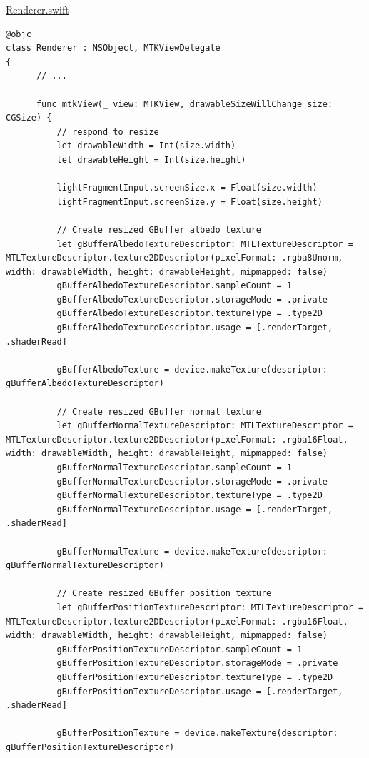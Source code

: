 \documentclass[11pt]{article}
\begin{document}
\uline{Renderer.swift}
\begin{verbatim}
@objc
class Renderer : NSObject, MTKViewDelegate
{
      // ...

      func mtkView(_ view: MTKView, drawableSizeWillChange size: CGSize) {
          // respond to resize
          let drawableWidth = Int(size.width)
          let drawableHeight = Int(size.height)

          lightFragmentInput.screenSize.x = Float(size.width)
          lightFragmentInput.screenSize.y = Float(size.height)

          // Create resized GBuffer albedo texture
          let gBufferAlbedoTextureDescriptor: MTLTextureDescriptor = MTLTextureDescriptor.texture2DDescriptor(pixelFormat: .rgba8Unorm, width: drawableWidth, height: drawableHeight, mipmapped: false)
          gBufferAlbedoTextureDescriptor.sampleCount = 1
          gBufferAlbedoTextureDescriptor.storageMode = .private
          gBufferAlbedoTextureDescriptor.textureType = .type2D
          gBufferAlbedoTextureDescriptor.usage = [.renderTarget, .shaderRead]

          gBufferAlbedoTexture = device.makeTexture(descriptor: gBufferAlbedoTextureDescriptor)

          // Create resized GBuffer normal texture
          let gBufferNormalTextureDescriptor: MTLTextureDescriptor = MTLTextureDescriptor.texture2DDescriptor(pixelFormat: .rgba16Float, width: drawableWidth, height: drawableHeight, mipmapped: false)
          gBufferNormalTextureDescriptor.sampleCount = 1
          gBufferNormalTextureDescriptor.storageMode = .private
          gBufferNormalTextureDescriptor.textureType = .type2D
          gBufferNormalTextureDescriptor.usage = [.renderTarget, .shaderRead]

          gBufferNormalTexture = device.makeTexture(descriptor: gBufferNormalTextureDescriptor)

          // Create resized GBuffer position texture
          let gBufferPositionTextureDescriptor: MTLTextureDescriptor = MTLTextureDescriptor.texture2DDescriptor(pixelFormat: .rgba16Float, width: drawableWidth, height: drawableHeight, mipmapped: false)
          gBufferPositionTextureDescriptor.sampleCount = 1
          gBufferPositionTextureDescriptor.storageMode = .private
          gBufferPositionTextureDescriptor.textureType = .type2D
          gBufferPositionTextureDescriptor.usage = [.renderTarget, .shaderRead]

          gBufferPositionTexture = device.makeTexture(descriptor: gBufferPositionTextureDescriptor)


\end{verbatim}
\end{document}
